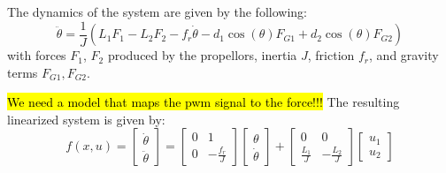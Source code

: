 The dynamics of the system are given by the following:
\begin{equation}
    \ddot\theta = \frac{1}{J}(L_1F_1-L_2F_2-f_r\dot\theta-d_1\cos(\theta)F_{G1}+d_2\cos(\theta)F_{G2})
    \label{eq:dyn-double-flying-arm}
\end{equation}
with forces $F_1$, $F_2$ produced by the propellors, inertia $J$, friction $f_r$, and gravity terms $F_{G1}, F_{G2}$. 


\hl{We need a model that maps the pwm signal to the force!!!}
The resulting linearized system is given by:
\begin{equation}
    f(x,u) = 
    \begin{bmatrix}
        \dot\theta \\
        \ddot \theta
    \end{bmatrix} 
    = 
    \begin{bmatrix}
        0 & 1 \\
        0 & -\frac{f_r}{J}
    \end{bmatrix}
    \begin{bmatrix}
        \theta \\
        \dot\theta
    \end{bmatrix}
    +
    \begin{bmatrix}
        0 & 0 \\
        \frac{L_1}{J} & -\frac{L_2}{J}
    \end{bmatrix}
    \begin{bmatrix}
        u_1 \\ 
        u_2
    \end{bmatrix}
    \label{eq:sys-linearized}
\end{equation}